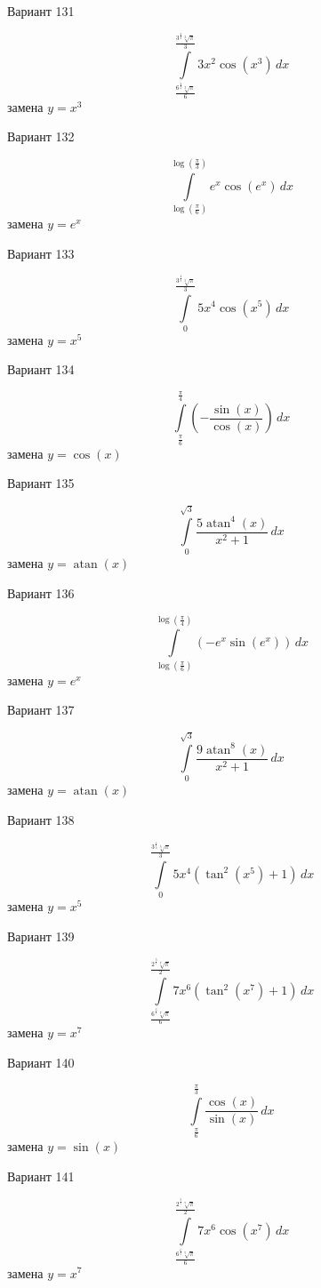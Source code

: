 \documentclass[11pt]{report}
\begin{document}
Вариант 131

$$\int\limits_{\frac{6^{\frac{2}{3}} \sqrt[3]{\pi}}{6}}^{\frac{3^{\frac{2}{3}} \sqrt[3]{\pi}}{3}} 3 x^{2} \cos{\left(x^{3} \right)}\, dx$$
замена $y = x^{3}$

Вариант 132

$$\int\limits_{\log{\left(\frac{\pi}{6} \right)}}^{\log{\left(\frac{\pi}{3} \right)}} e^{x} \cos{\left(e^{x} \right)}\, dx$$
замена $y = e^{x}$

Вариант 133

$$\int\limits_{0}^{\frac{3^{\frac{4}{5}} \sqrt[5]{\pi}}{3}} 5 x^{4} \cos{\left(x^{5} \right)}\, dx$$
замена $y = x^{5}$

Вариант 134

$$\int\limits_{\frac{\pi}{6}}^{\frac{\pi}{4}} \left(- \frac{\sin{\left(x \right)}}{\cos{\left(x \right)}}\right)\, dx$$
замена $y = \cos{\left(x \right)}$

Вариант 135

$$\int\limits_{0}^{\sqrt{3}} \frac{5 \operatorname{atan}^{4}{\left(x \right)}}{x^{2} + 1}\, dx$$
замена $y = \operatorname{atan}{\left(x \right)}$

Вариант 136

$$\int\limits_{\log{\left(\frac{\pi}{6} \right)}}^{\log{\left(\frac{\pi}{4} \right)}} \left(- e^{x} \sin{\left(e^{x} \right)}\right)\, dx$$
замена $y = e^{x}$

Вариант 137

$$\int\limits_{0}^{\sqrt{3}} \frac{9 \operatorname{atan}^{8}{\left(x \right)}}{x^{2} + 1}\, dx$$
замена $y = \operatorname{atan}{\left(x \right)}$

Вариант 138

$$\int\limits_{0}^{\frac{3^{\frac{4}{5}} \sqrt[5]{\pi}}{3}} 5 x^{4} \left(\tan^{2}{\left(x^{5} \right)} + 1\right)\, dx$$
замена $y = x^{5}$

Вариант 139

$$\int\limits_{\frac{6^{\frac{6}{7}} \sqrt[7]{\pi}}{6}}^{\frac{2^{\frac{5}{7}} \sqrt[7]{\pi}}{2}} 7 x^{6} \left(\tan^{2}{\left(x^{7} \right)} + 1\right)\, dx$$
замена $y = x^{7}$

Вариант 140

$$\int\limits_{\frac{\pi}{6}}^{\frac{\pi}{3}} \frac{\cos{\left(x \right)}}{\sin{\left(x \right)}}\, dx$$
замена $y = \sin{\left(x \right)}$

Вариант 141

$$\int\limits_{\frac{6^{\frac{6}{7}} \sqrt[7]{\pi}}{6}}^{\frac{2^{\frac{5}{7}} \sqrt[7]{\pi}}{2}} 7 x^{6} \cos{\left(x^{7} \right)}\, dx$$
замена $y = x^{7}$
\end{document}
